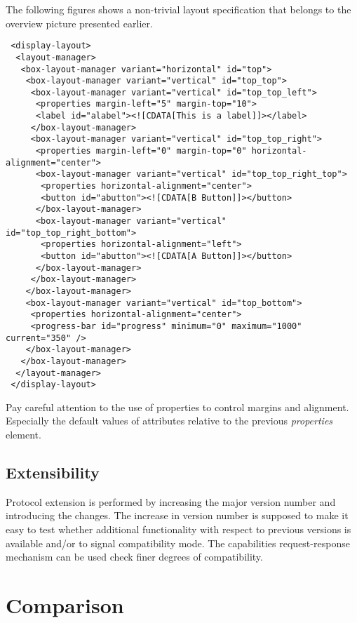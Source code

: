 \documentclass{article}
\begin{document}
   The following figures shows a non-trivial layout specification that belongs
   to the overview picture presented earlier.

   \small \begin{verbatim}
 <display-layout>
  <layout-manager>
   <box-layout-manager variant="horizontal" id="top">
    <box-layout-manager variant="vertical" id="top_top">
     <box-layout-manager variant="vertical" id="top_top_left">
      <properties margin-left="5" margin-top="10">
      <label id="alabel"><![CDATA[This is a label]]></label>
     </box-layout-manager>
     <box-layout-manager variant="vertical" id="top_top_right">
      <properties margin-left="0" margin-top="0" horizontal-alignment="center">
      <box-layout-manager variant="vertical" id="top_top_right_top">
       <properties horizontal-alignment="center">
       <button id="abutton"><![CDATA[B Button]]></button>
      </box-layout-manager>
      <box-layout-manager variant="vertical" id="top_top_right_bottom">
       <properties horizontal-alignment="left">
       <button id="abutton"><![CDATA[A Button]]></button>
      </box-layout-manager>
     </box-layout-manager>
    </box-layout-manager>
    <box-layout-manager variant="vertical" id="top_bottom">
     <properties horizontal-alignment="center">
     <progress-bar id="progress" minimum="0" maximum="1000" current="350" />
    </box-layout-manager>
   </box-layout-manager>
  </layout-manager>
 </display-layout>\end{verbatim}
  \normalsize

  \noindent Pay careful attention to the use of properties to control margins and
  alignment. Especially the default values of attributes relative to the
  previous \textit{properties} element.

  \subsection{Extensibility}

   Protocol extension is performed by increasing the major version number and
   introducing the changes. The increase in version number is supposed to make
   it easy to test whether additional functionality with respect to previous
   versions is available and/or to signal compatibility mode. The capabilities
   request-response mechanism can be used check finer degrees of compatibility.
   
  \section{Comparison}
  
\end{document}
